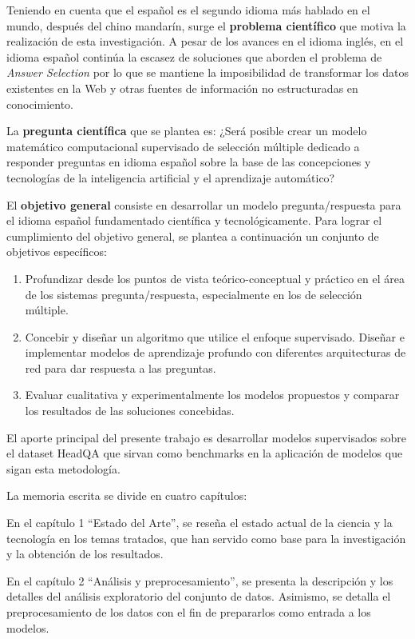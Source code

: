 Teniendo en cuenta que el español es el segundo idioma más hablado en el mundo, después del chino mandarín, surge el \textbf{problema científico} que motiva la realización de esta investigación. A pesar de los avances en el idioma inglés, en el idioma español continúa la escasez de soluciones que aborden el problema de \textit{Answer Selection} por lo que se mantiene la imposibilidad de transformar los datos existentes en la Web y otras fuentes de información no estructuradas en conocimiento.

La \textbf{pregunta científica} que se plantea es: ¿Será posible crear un modelo matemático computacional supervisado de selección múltiple dedicado a responder preguntas en idioma español sobre la base de las concepciones y tecnologías de la inteligencia artificial y el aprendizaje automático?

El \textbf{objetivo general} consiste en desarrollar un modelo pregunta/respuesta para el idioma español fundamentado científica y tecnológicamente. Para lograr el cumplimiento del objetivo general, se plantea a continuación un conjunto de objetivos específicos:

\begin{enumerate}
    \item Profundizar desde los puntos de vista teórico-conceptual y práctico en el área de los sistemas pregunta/respuesta, especialmente en los de selección múltiple. 
    \item Concebir y diseñar un algoritmo que utilice el enfoque supervisado. Diseñar e implementar modelos de aprendizaje profundo con diferentes arquitecturas de red para dar respuesta a las preguntas.
    \item Evaluar cualitativa y experimentalmente los modelos propuestos y comparar los resultados de las soluciones concebidas.
\end{enumerate}

El aporte principal del presente trabajo es desarrollar modelos supervisados sobre el dataset HeadQA que sirvan como benchmarks en la aplicación de modelos que sigan esta metodología. 

La memoria escrita se divide en cuatro capítulos:

En el capítulo 1 “Estado del Arte”, se reseña el estado actual de la ciencia y la tecnología en los temas tratados, que han servido como base para la investigación y la obtención de los resultados.

En el capítulo 2 “Análisis y preprocesamiento”, se presenta la descripción y los detalles del análisis exploratorio del conjunto de datos. Asimismo, se detalla el preprocesamiento de los datos con el fin de prepararlos como entrada a los modelos. 


